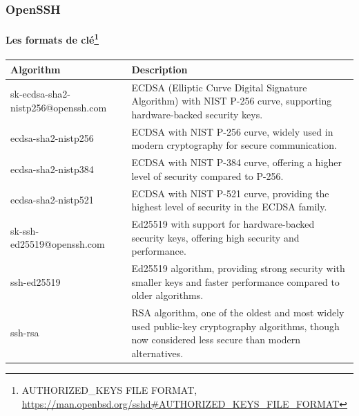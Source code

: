 \documentclass{beamer}
\begin{document}
    \begin{frame}
        \transdissolve
        \frametitle{OpenSSH}
        \framesubtitle{Les formats de clé\footnote{AUTHORIZED\_KEYS FILE FORMAT, \url{https://man.openbsd.org/sshd\#AUTHORIZED_KEYS_FILE_FORMAT}}}
        \begin{footnotesize}
            \begin{table}[h!]
                \centering
                \begin{tabular}{|p{3cm}|p{8cm}|}
                    \hline
                    \textbf{Algorithm}                 & \textbf{Description}                                                                                                                                  \\
                    \hline
                    sk-ecdsa-sha2-nistp256@openssh.com & ECDSA (Elliptic Curve Digital Signature Algorithm) with NIST P-256 curve, supporting hardware-backed security keys.                                   \\
                    \hline
                    ecdsa-sha2-nistp256                & ECDSA with NIST P-256 curve, widely used in modern cryptography for secure communication.                                                             \\
                    \hline
                    ecdsa-sha2-nistp384                & ECDSA with NIST P-384 curve, offering a higher level of security compared to P-256.                                                                   \\
                    \hline
                    ecdsa-sha2-nistp521                & ECDSA with NIST P-521 curve, providing the highest level of security in the ECDSA family.                                                             \\
                    \hline
                    sk-ssh-ed25519@openssh.com         & Ed25519 with support for hardware-backed security keys, offering high security and performance.                                                       \\
                    \hline
                    ssh-ed25519                        & Ed25519 algorithm, providing strong security with smaller keys and faster performance compared to older algorithms.                                   \\
                    \hline
                    ssh-rsa                            & RSA algorithm, one of the oldest and most widely used public-key cryptography algorithms, though now considered less secure than modern alternatives. \\
                    \hline
                \end{tabular}
            \end{table}
        \end{footnotesize}
    \end{frame}
\end{document}

